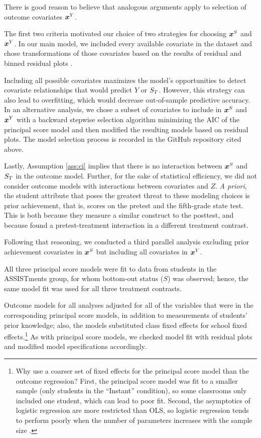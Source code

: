 \documentclass[]{article}
\begin{document}
There is good reason to believe that analogous arguments apply to selection of outcome covariates $\bm{x}^Y$.

The first two criteria motivated our choice of two strategies for choosing $\bm{x}^S$ and $\bm{x}^Y$.
In our main model, we included every available covariate in the dataset and chose transformations of those covariates based on the results of residual and binned residual plots \citep{arm}.

Including all possible covariates maximizes the model's opportunities to detect covariate relationships that would predict $Y$ or $S_T$.
However, this strategy can also lead to overfitting, which would decrease out-of-sample predictive accuracy.
In an alternative analysis, we chose a subset of covariates to include in $\bm{x}^S$ and $\bm{x}^Y$ with a backward stepwise selection algorithm minimizing the AIC \citep{aic} of the principal score model and then modified the resulting models based on residual plots.
The model selection process is recorded in the GitHub repository cited above.

Lastly, Assumption \ref{ass:ci} implies that there is no interaction between $\bm{x}^S$ and $S_T$ in the outcome model. Further, for the sake of statistical efficiency, we did not consider outcome models with interactions between covariates and $Z$.
\emph{A priori}, the student attribute that poses the greatest threat to these modeling choices is prior achievement, that is, scores on the pretest and the fifth-grade state test.
This is both because they measure a similar construct to the posttest, and because \cite{impactPaper} found a pretest-treatment interaction in a different treatment contrast.

Following that reasoning, we conducted a third parallel analysis excluding prior achievement covariates in $\bm{x}^S$ but including all covariates in $\bm{x}^Y$.

All three principal score models were fit to data from students in the ASSISTments group, for whom bottom-out status ($S$) was observed; hence, the same model fit was used for all three treatment contrasts.

Outcome models for all analyses adjusted for all of the variables that were in the corresponding principal score models, in addition to measurements of students' prior knowledge; also, the models substituted class fixed effects for school fixed effects.\footnote{Why use a coarser set of fixed effects for the principal score model than the outcome regression? First, the principal score model was fit to a smaller sample (only students in the ``Instant'' condition), so some classrooms only included one student, which can lead to poor fit. Second, the asymptotics of logistic regression are more restricted than OLS, so logistic regression tends to perform poorly when the number of parameters increases with the sample size \citep{agresti}.}
As with principal score models, we checked model fit with residual plots and modified model specifications accordingly.
\end{document}
